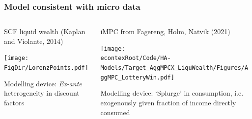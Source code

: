 \documentclass[pdflatex,aspectratio=169]{beamer}
\begin{document}
\begin{frame}
	\frametitle{Model consistent with micro data}
	
	\hypertarget{ConsistentWithMicroData}{}
	
	\begin{columns}
		\begin{column}{0.4\textwidth}
			SCF liquid wealth (Kaplan and Violante, 2014) 
			
			\texttt{[image: \\FigDir/LorenzPoints.pdf]}
			
			Modelling device: \textit{Ex-ante} heterogeneity in discount factors
			
		\end{column}
	
		\pause
		
		\begin{column}{0.4\textwidth}  	
			iMPC from Fagereng, Holm, Natvik (2021)	
			
			\texttt{[image: \\econtexRoot/Code/HA-Models/Target\_AggMPCX\_LiquWealth/Figures/AggMPC\_LotteryWin.pdf]}
			
			Modelling device: `Splurge' in consumption, i.e. exogenously given fraction of income directly consumed
		\end{column}
	\end{columns}
	
	\vspace{0.5cm}
	\hyperlink{ParametrizationStrategy}{}
	\hspace{1cm}
	\hyperlink{Parameters}{}
	\hspace{1cm}
	\hyperlink{EstimationBetaNabla}{}
	
\end{frame}
\end{document}
